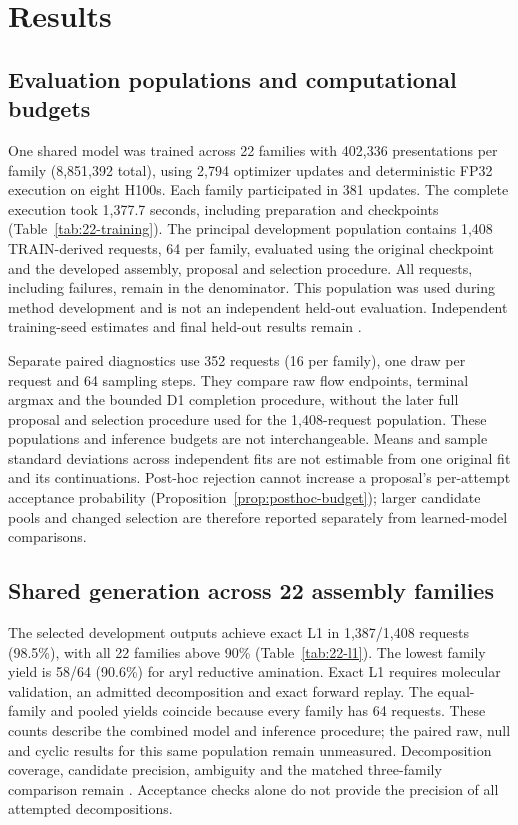 \section{Results}
\label{sec:results}

\subsection{Evaluation populations and computational budgets}
One shared model was trained across 22 families with 402,336 presentations per family
(8,851,392 total), using 2,794 optimizer updates and deterministic FP32 execution on eight H100s.
Each family participated in 381 updates. The complete execution took 1,377.7 seconds, including
preparation and checkpoints (Table~\ref{tab:22-training}). The principal development population
contains 1,408 TRAIN-derived requests, 64 per family, evaluated using the original checkpoint and
the developed assembly, proposal and selection procedure. All requests, including failures,
remain in the denominator. This population was used during method development and is not an
independent held-out evaluation. Independent training-seed estimates and final held-out results
remain .

Separate paired diagnostics use 352 requests (16 per family), one draw per request and 64
sampling steps. They compare raw flow endpoints, terminal argmax and the bounded D1 completion
procedure, without the later full proposal and selection procedure used for the 1,408-request
population. These populations and inference budgets are not interchangeable. Means and sample
standard deviations across independent fits are not estimable from one original fit and its
continuations. Post-hoc rejection cannot increase a proposal's per-attempt acceptance probability
(Proposition~\ref{prop:posthoc-budget}); larger candidate pools and changed selection are therefore
reported separately from learned-model comparisons.

\subsection{Shared generation across 22 assembly families}
The selected development outputs achieve exact L1 in 1,387/1,408 requests (98.5\%), with all 22
families above 90\% (Table~\ref{tab:22-l1}). The lowest family yield is 58/64 (90.6\%) for aryl
reductive amination. Exact L1 requires molecular validation, an admitted decomposition and exact
forward replay. The equal-family and pooled yields coincide because every family has 64 requests.
These counts describe the combined model and inference procedure; the paired raw, null and cyclic
results for this same population remain unmeasured. Decomposition coverage, candidate precision,
ambiguity and the matched three-family comparison remain
. Acceptance checks alone
do not provide the precision of all attempted decompositions.

